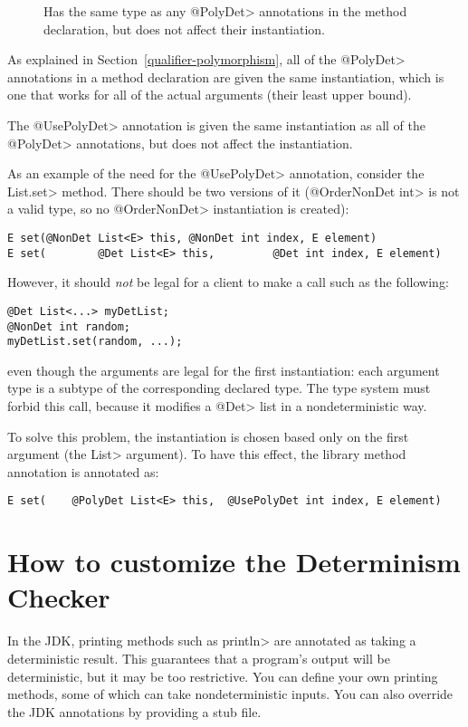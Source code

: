 \begin{description}
\item[]
  Has the same type as any \<@PolyDet> annotations in the method
  declaration, but does not affect their instantiation.
\end{description}

As explained in Section~\ref{qualifier-polymorphism},
all of the \<@PolyDet> annotations in a method declaration are given the same
instantiation, which is one that works for all of the actual arguments
(their least upper bound).

The \<@UsePolyDet> annotation is given the same instantiation as all of the
\<@PolyDet> annotations, but does not affect the instantiation.

As an example of the need for the \<@UsePolyDet> annotation, consider the
\<List.set> method.  There should be two versions of it (\<@OrderNonDet
int> is not a valid type, so no \<@OrderNonDet> instantiation is created):

\begin{Verbatim}
E set(@NonDet List<E> this, @NonDet int index, E element)
E set(        @Det List<E> this,         @Det int index, E element)
\end{Verbatim}

\noindent
However, it should \emph{not} be legal for a client to make a call such as
the following:

\begin{Verbatim}
@Det List<...> myDetList;
@NonDet int random;
myDetList.set(random, ...);
\end{Verbatim}

\noindent
even though the arguments are legal for the first instantiation:
each argument type is a subtype of the corresponding declared type.
The type system must forbid this call, because it modifies a
\<@Det> list in a nondeterministic way.

To solve this problem, the instantiation is chosen based only on the first
argument (the \<List> argument).  To have this effect, the library method
annotation is annotated as:

\begin{Verbatim}
E set(    @PolyDet List<E> this,  @UsePolyDet int index, E element)
\end{Verbatim}



\section{How to customize the Determinism Checker\label{determinism-customization}}

In the JDK, printing methods such as \<println> are annotated as taking a
deterministic result.  This guarantees that a program's output will be
deterministic, but it may be too restrictive.  You can define your own
printing methods, some of which can take nondeterministic inputs.  You can
also override the JDK annotations by providing a stub file.


